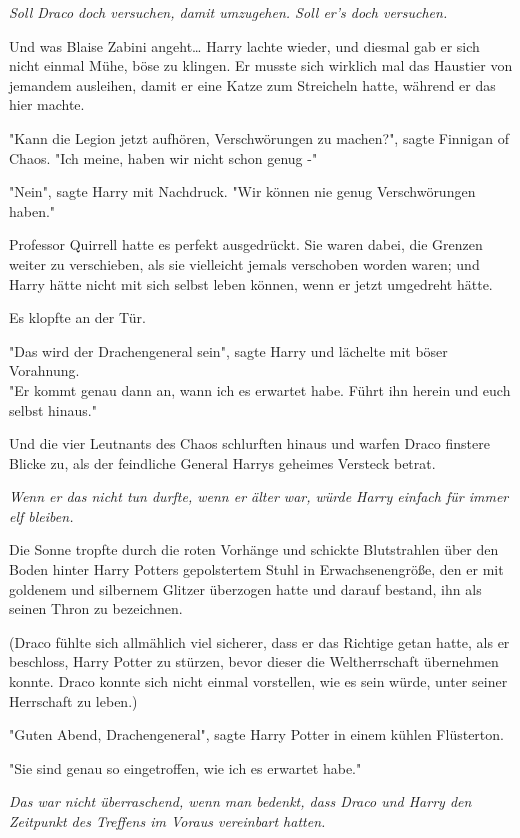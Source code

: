 {\emph{Soll Draco doch versuchen, damit umzugehen. Soll er's doch versuchen.}

Und was Blaise Zabini angeht… Harry lachte wieder, und diesmal gab er sich nicht einmal Mühe, böse zu klingen. Er musste sich wirklich mal das Haustier von jemandem ausleihen, damit er eine Katze zum Streicheln hatte, während er das hier machte.

"Kann die Legion jetzt aufhören, Verschwörungen zu machen?", sagte Finnigan of Chaos. "Ich meine, haben wir nicht schon genug -"

"Nein", sagte Harry mit Nachdruck. "Wir können nie genug Verschwörungen haben."

Professor Quirrell hatte es perfekt ausgedrückt. Sie waren dabei, die Grenzen weiter zu verschieben, als sie vielleicht jemals verschoben worden waren; und Harry hätte nicht mit sich selbst leben können, wenn er jetzt umgedreht hätte.

Es klopfte an der Tür.

"Das wird der Drachengeneral sein", sagte Harry und lächelte mit böser Vorahnung.\\ "Er kommt genau dann an, wann ich es erwartet habe. Führt ihn herein und euch selbst hinaus."

Und die vier Leutnants des Chaos schlurften hinaus und warfen Draco finstere Blicke zu, als der feindliche General Harrys geheimes Versteck betrat.

\emph{Wenn er das nicht tun durfte, wenn er älter war, würde Harry einfach für immer elf bleiben.}

Die Sonne tropfte durch die roten Vorhänge und schickte Blutstrahlen über den Boden hinter Harry Potters gepolstertem Stuhl in Erwachsenengröße, den er mit goldenem und silbernem Glitzer überzogen hatte und darauf bestand, ihn als seinen Thron zu bezeichnen.

(Draco fühlte sich allmählich viel sicherer, dass er das Richtige getan hatte, als er beschloss, Harry Potter zu stürzen, bevor dieser die Weltherrschaft übernehmen konnte. Draco konnte sich nicht einmal vorstellen, wie es sein würde, unter seiner Herrschaft zu leben.)

"Guten Abend, Drachengeneral", sagte Harry Potter in einem kühlen Flüsterton.

"Sie sind genau so eingetroffen, wie ich es erwartet habe."

\emph{Das war nicht überraschend, wenn man bedenkt, dass Draco und Harry den Zeitpunkt des Treffens im Voraus vereinbart hatten.}

}
